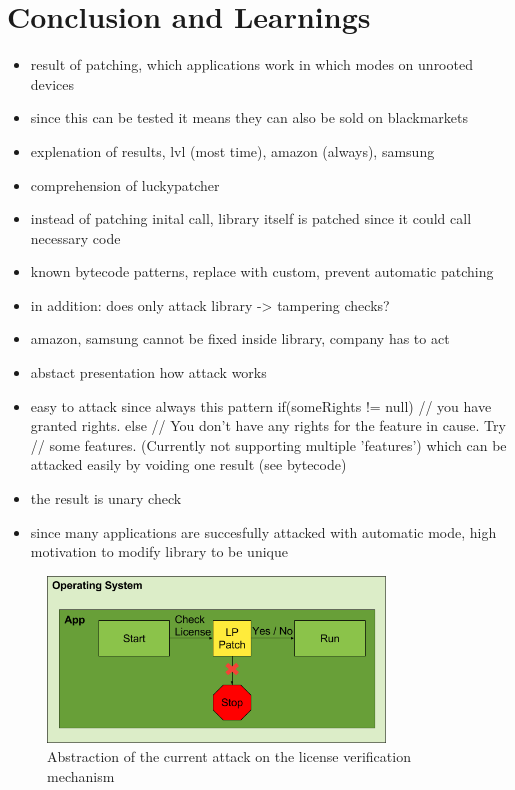 \section{Conclusion and Learnings} \label{section:luckypatcher-learnings}
\begin{itemize}
    \item result of patching, which applications work in which modes on unrooted devices
    \item since this can be tested it means they can also be sold on blackmarkets
    \item explenation of results, lvl (most time), amazon (always), samsung
    \item comprehension of luckypatcher
    \item instead of patching inital call, library itself is patched since it could call necessary code
    \item known bytecode patterns, replace with custom, prevent automatic patching
    \item in addition: does only attack library -> tampering checks?
    \item amazon, samsung cannot be fixed inside library, company has to act
    \item abstact presentation how attack works
    \item easy to attack since always this pattern if(someRights != null){
           // you have granted rights.
       } else {
           // You don't have any rights for the feature in cause. Try
           // some features. (Currently not supporting multiple 'features')
       } which can be attacked easily by voiding one result (see bytecode)
       \item the result is unary check
    \item since many applications are succesfully attacked with automatic mode, high motivation to modify library to be unique
\end{itemize}

\begin{figure}[h]
    \centering
    \includegraphics[width=0.8\textwidth]{data/verificationNowAttack.png}
    \caption{Abstraction of the current attack on the license verification mechanism}
    \label{fig:verificationNowAttack}
\end{figure}
